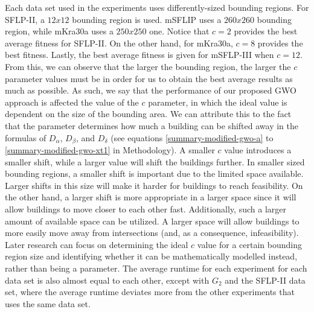 Each data set used in the experiments uses differently-sized bounding regions. For SFLP-II, a $12x12$ bounding region is used. mSFLIP uses a $260x260$ bounding region, while mKra30a uses a $250x250$ one. Notice that $c = 2$ provides the best average fitness for SFLP-II. On the other hand, for mKra30a, $c = 8$ provides the best fitness. Lastly, the best average fitness is given for mSFLP-III when $c = 12$. From this, we can observe that the larger the bounding region, the larger the $c$ parameter values must be in order for us to obtain the best average results as much as possible. As such, we say that the performance of our proposed GWO approach is affected the value of the $c$ parameter, in which the ideal value is dependent on the size of the bounding area. We can attribute this to the fact that the parameter determines how much a building can be shifted away in the formulas of $D_{\alpha}$, $D_{\beta}$, and $D_{\delta}$ (see equations \ref{summary-modified-gwo-a} to \ref{summary-modified-gwo-xt1} in Methodology). A smaller $c$ value introduces a smaller shift, while a larger value will shift the buildings further. In smaller sized bounding regions, a smaller shift is important due to the limited space available. Larger shifts in this size will make it harder for buildings to reach feasibility. On the other hand, a larger shift is more appropriate in a larger space since it will allow buildings to move closer to each other fast. Additionally, such a larger amount of available space can be utilized. A larger space will allow buildings to more easily move away from intersections (and, as a consequence, infeasibility). Later research can focus on determining the ideal $c$ value for a certain bounding region size and identifying whether it can be mathematically modelled instead, rather than being a parameter. The average runtime for each experiment for each data set is also almost equal to each other, except with $G_{2}$ and the SFLP-II data set, where the average runtime deviates more from the other experiments that uses the same data set.

